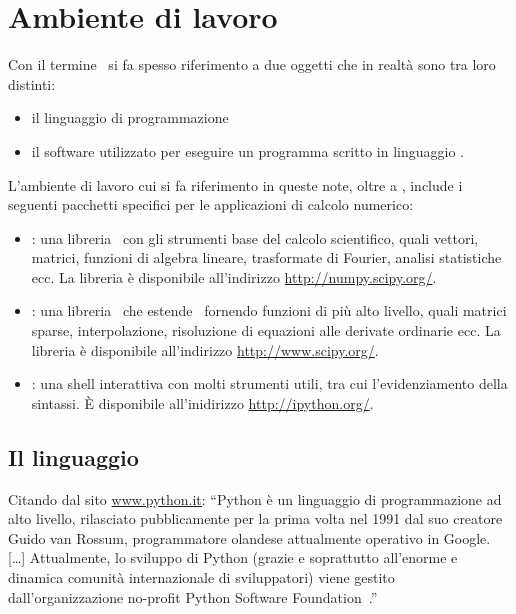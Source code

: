 \chapter{Ambiente di lavoro}
\label{cap:ambiente-di-lavoro}

Con il termine \python\ si fa spesso riferimento a due oggetti che in realt\`a
sono tra loro distinti:
\begin{itemize}
  \item il linguaggio di programmazione \python
  \item il software utilizzato per eseguire un programma scritto in linguaggio
    \python.
\end{itemize}
L'ambiente di lavoro cui si fa riferimento in queste note, oltre a \python,
include i seguenti pacchetti specifici per le applicazioni di calcolo numerico:
\begin{itemize}
  \item \numpy: una libreria \python\ con gli strumenti base del calcolo
    scientifico, quali vettori, matrici, funzioni di algebra lineare,
    trasformate di Fourier, analisi statistiche ecc. La libreria \`e disponibile
    all'indirizzo \url{http://numpy.scipy.org/}.
  \item \scipy: una libreria \python\ che estende \numpy\ fornendo
    funzioni di pi\`u alto livello, quali matrici sparse, interpolazione,
    risoluzione di equazioni alle derivate ordinarie ecc. La libreria \`e
    disponibile all'indirizzo \url{http://www.scipy.org/}.
  \item \ipython: una shell interattiva con molti strumenti utili, tra cui
    l'evidenziamento della sintassi. \`E disponibile all'inidirizzo
    \url{http://ipython.org/}.
\end{itemize}


\section{Il linguaggio \python}

Citando dal sito \url{www.python.it}: ``Python \`e un linguaggio di
programmazione ad alto livello, rilasciato pubblicamente per la prima volta nel
1991 dal suo creatore Guido van Rossum, programmatore olandese attualmente
operativo in Google. [\ldots] Attualmente, lo sviluppo di Python (grazie
e soprattutto all'enorme e dinamica comunit\`a internazionale di sviluppatori)
viene gestito dall'organizzazione no-profit Python Software
Foundation~\cite{PythonSoftwareFoundation}.''

